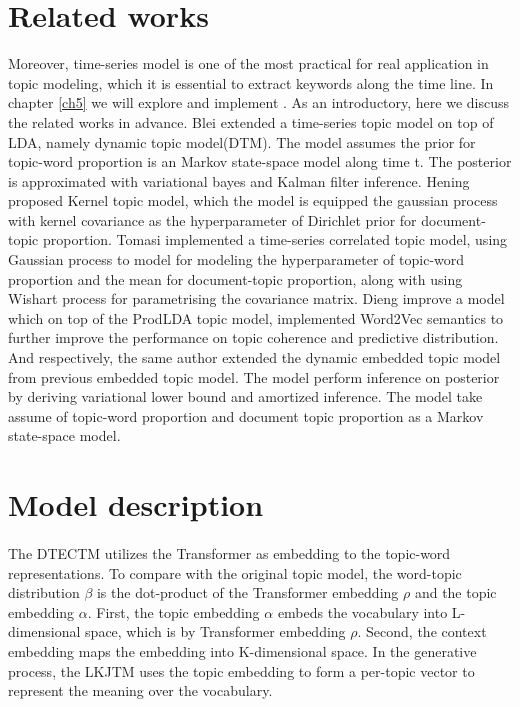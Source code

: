 \section{Related works}
Moreover, time-series model is one of the most practical for real application in topic modeling, which it is essential to extract keywords along the time line. In chapter \ref{ch5} we will explore and implement . As an introductory, here we discuss the related works in advance.
Blei \cite{blei_dynamic_2006} extended a time-series topic model on top of LDA, namely dynamic topic model(DTM). The model assumes the prior for topic-word proportion is an Markov state-space model along time t. The posterior is approximated with variational bayes and Kalman filter inference.
Hening\cite{hennig_kernel_2012} proposed Kernel topic model, which the model is equipped the gaussian process with kernel covariance as the hyperparameter of Dirichlet prior for document-topic proportion.
Tomasi\cite{tomasi_stochastic_nodate} implemented a time-series correlated topic model, using Gaussian process to model for modeling the hyperparameter of topic-word proportion and the mean for document-topic proportion, along with using Wishart process for parametrising the covariance matrix.
Dieng\cite{dieng_topic_2019} improve a model which on top of the ProdLDA topic model, implemented Word2Vec semantics to further improve the performance on topic coherence and predictive distribution. And respectively, the same author\cite{dieng_dynamic_2019} extended the dynamic embedded topic model from previous embedded topic model. The model perform inference on posterior by deriving variational lower bound and amortized inference. The model take assume of topic-word proportion and document topic proportion as a Markov state-space model.
\section{Model description}
\paragraph{}The DTECTM utilizes the Transformer as embedding to the topic-word representations. To compare with the original topic model, the word-topic distribution $ \beta $ is the dot-product of the Transformer embedding $ \rho $ and the topic embedding $ \alpha $.
First, the topic embedding $ \alpha $ embeds the vocabulary into L-dimensional space, which is by Transformer embedding $ \rho $. Second, the context embedding maps the embedding into K-dimensional space. 
In the generative process, the LKJTM uses the topic embedding to form a per-topic vector to represent the meaning over the vocabulary.

